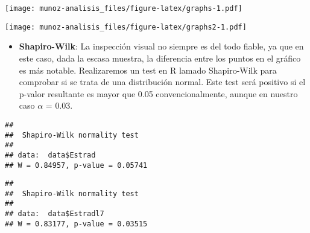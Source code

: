 \documentclass[
]{article}
\newenvironment{Shaded}{\begin{snugshade}}{\end{snugshade}}
\newcommand{\DataTypeTok}[1]{\textcolor[rgb]{0.13,0.29,0.53}{#1}}
\newcommand{\KeywordTok}[1]{\textcolor[rgb]{0.13,0.29,0.53}{\textbf{#1}}}
\newcommand{\NormalTok}[1]{#1}
\newcommand{\OperatorTok}[1]{\textcolor[rgb]{0.81,0.36,0.00}{\textbf{#1}}}
\newcommand{\StringTok}[1]{\textcolor[rgb]{0.31,0.60,0.02}{#1}}
\providecommand{\tightlist}{%
  \setlength{\itemsep}{0pt}\setlength{\parskip}{0pt}}
\begin{document}
\texttt{[image: munoz-analisis\_files/figure-latex/graphs-1.pdf]}

\begin{Shaded}
\end{Shaded}

\texttt{[image: munoz-analisis\_files/figure-latex/graphs2-1.pdf]}

\begin{itemize}
\tightlist
\item
  \textbf{Shapiro-Wilk}: La inspección visual no siempre es del todo
  fiable, ya que en este caso, dada la escasa muestra, la diferencia
  entre los puntos en el gráfico es más notable. Realizaremos un test en
  R lamado Shapiro-Wilk para comprobar si se trata de una distribución
  normal. Este test será positivo si el p-valor resultante es mayor que
  0.05 convencionalmente, aunque en nuestro caso \(\alpha\) = 0.03.
\end{itemize}

\begin{Shaded}
\end{Shaded}

\begin{verbatim}
## 
##  Shapiro-Wilk normality test
## 
## data:  data$Estrad
## W = 0.84957, p-value = 0.05741
\end{verbatim}

\begin{Shaded}
\end{Shaded}

\begin{verbatim}
## 
##  Shapiro-Wilk normality test
## 
## data:  data$Estradl7
## W = 0.83177, p-value = 0.03515
\end{verbatim}
\end{document}
